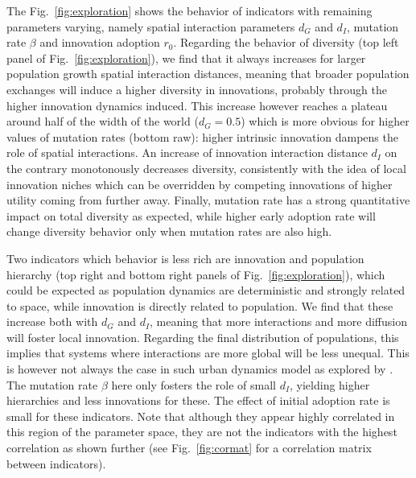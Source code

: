 \documentclass[letterpaper]{article}
\begin{document}
The Fig.~\ref{fig:exploration} shows the behavior of indicators with remaining parameters varying, namely spatial interaction parameters $d_G$ and $d_I$, mutation rate $\beta$ and innovation adoption $r_0$. Regarding the behavior of diversity (top left panel of Fig.~\ref{fig:exploration}), we find that it always increases for larger population growth spatial interaction distances, meaning that broader population exchanges will induce a higher diversity in innovations, probably through the higher innovation dynamics induced. This increase however reaches a plateau around half of the width of the world ($d_G = 0.5$) which is more obvious for higher values of mutation rates (bottom raw): higher intrinsic innovation dampens the role of spatial interactions. An increase of innovation interaction distance $d_I$ on the contrary monotonously decreases diversity, consistently with the idea of local innovation niches which can be overridden by competing innovations of higher utility coming from further away. Finally, mutation rate has a strong quantitative impact on total diversity as expected, while higher early adoption rate will change diversity behavior only when mutation rates are also high.

Two indicators which behavior is less rich are innovation and population hierarchy (top right and bottom right panels of Fig.~\ref{fig:exploration}), which could be expected as population dynamics are deterministic and strongly related to space, while innovation is directly related to population. We find that these increase both with $d_G$ and $d_I$, meaning that more interactions and more diffusion will foster local innovation. Regarding the final distribution of populations, this implies that systems where interactions are more global will be less unequal. This is however not always the case in such urban dynamics model as explored by \cite{raimbault2020hierarchy}. The mutation rate $\beta$ here only fosters the role of small $d_I$, yielding higher hierarchies and less innovations for these. The effect of initial adoption rate is small for these indicators. Note that although they appear highly correlated in this region of the parameter space, they are not the indicators with the highest correlation as shown further (see Fig.~\ref{fig:cormat} for a correlation matrix between indicators).
\end{document}
